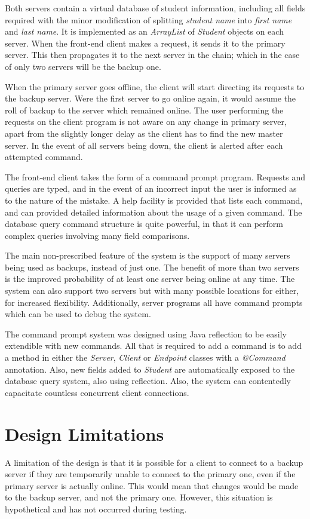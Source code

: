 \documentclass[a4paper,11pt]{article}
\begin{document}
Both servers contain a virtual database of student information, including all fields required with the minor modification of splitting \emph{student name} into \emph{first name} and \emph{last name}. It is implemented as an \emph{ArrayList} of \emph{Student} objects on each server. When the front-end client makes a request, it sends it to the primary server. This then propagates it to the next server in the chain; which in the case of only two servers will be the backup one.

When the primary server goes offline, the client will start directing its requests to the backup server. Were the first server to go online again, it would assume the roll of backup to the server which remained online. The user performing the requests on the client program is not aware on any change in primary server, apart from the slightly longer delay as the client has to find the new master server. In the event of all servers being down, the client is alerted after each attempted command.

The front-end client takes the form of a command prompt program. Requests and queries are typed, and in the event of an incorrect input the user is informed as to the nature of the mistake. A help facility is provided that lists each command, and can provided detailed information about the usage of a given command. The database query command structure is quite powerful, in that it can perform complex queries involving many field comparisons.

The main non-prescribed feature of the system is the support of many servers being used as backups, instead of just one. The benefit of more than two servers is the improved probability of at least one server being online at any time. The system can also support two servers but with many possible locations for either, for increased flexibility. Additionally, server programs all have command prompts which can be used to debug the system.

The command prompt system was designed using Java reflection to be easily extendible with new commands. All that is required to add a command is to add a method in either the \emph{Server}, \emph{Client} or \emph{Endpoint} classes with a \emph{@Command} annotation. Also, new fields added to \emph{Student} are automatically exposed to the database query system, also using reflection. Also, the system can contentedly capacitate countless concurrent client connections.

\section{Design Limitations}
A limitation of the design is that it is possible for a client to connect to a backup server if they are temporarily unable to connect to the primary one, even if the primary server is actually online. This would mean that changes would be made to the backup server, and not the primary one. However, this situation is hypothetical and has not occurred during testing.
\end{document}
